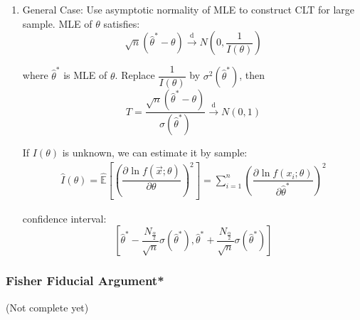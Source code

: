 \begin{enumerate}

    
    \item General Case: Use asymptotic normality of MLE to construct CLT for large sample. MLE of $\theta$ satisfies:
    \begin{equation}
        \sqrt{n}(\hat{\theta}^*-\theta)\xrightarrow[]{\mathrm{d}}N(0,\frac{1}{I(\theta )})
    \end{equation}

    where $\hat{\theta}^*$ is MLE of $\theta$. Replace $\dfrac{1}{I(\theta)}$ by $\sigma^2(\hat{\theta}^*)$, then
    \begin{equation}
        T=\frac{\sqrt{n}(\hat{\theta}^*-\theta)}{\sigma(\hat{\theta}^*)}\xrightarrow[]{\mathrm{d}}N(0,1)    
    \end{equation}

    If $ I(\theta ) $ is unknown, we can estimate it by sample:
    \begin{align*}
        \hat{I}(\theta )=\hat{\mathbb{E}}\left[\left(\dfrac{\partial^{} \ln f(\vec{x};\theta )}{\partial \theta ^{}}\right)^2\right]=\sum_{i=1}^n \left(\dfrac{\partial^{} \ln f(x_i;\theta )}{\partial \hat{\theta}^*}\right)^2
    \end{align*}

    confidence interval:
    \begin{equation}
        \left[\hat{\theta}^*-\frac{N_{\frac{\alpha}{2}}}{\sqrt{n}}\sigma(\hat{\theta}^*),\hat{\theta}^*+\frac{N_{\frac{\alpha}{2}}}{\sqrt{n}}\sigma(\hat{\theta}^*)\right]
    \end{equation}
    \end{enumerate}

\subsubsection{Fisher Fiducial Argument*}\label{SubSectionFisherFiducialArgument}
    (Not complete yet)

